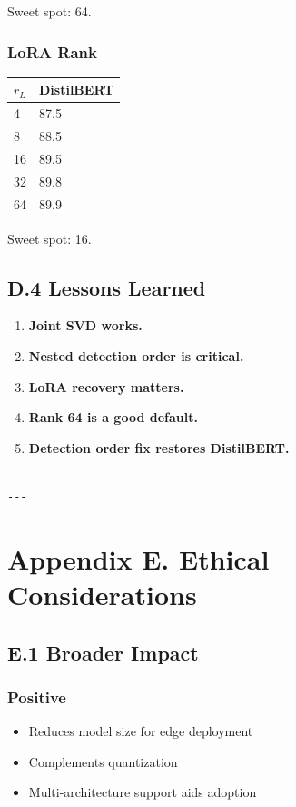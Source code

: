 Sweet spot: 64.

\subsubsection{LoRA Rank}

\begin{table}[H]
\centering
\small
\begin{tabular}{ll}
\toprule
\textbf{$r_L$} & \textbf{DistilBERT} \\
\midrule
4 & 87.5 \\
8 & 88.5 \\
16 & 89.5 \\
32 & 89.8 \\
64 & 89.9 \\
\bottomrule
\end{tabular}
\end{table}

Sweet spot: 16.

\subsection{D.4 Lessons Learned}

\begin{enumerate}
\item \textbf{Joint SVD works.}
\item \textbf{Nested detection order is critical.}
\item \textbf{LoRA recovery matters.}
\item \textbf{Rank 64 is a good default.}
\item \textbf{Detection order fix restores DistilBERT.}
\end{enumerate}
\begin{lstlisting}

---
\end{lstlisting}

\section{Appendix E. Ethical Considerations}

\subsection{E.1 Broader Impact}

\subsubsection{Positive}
\begin{itemize}
\item Reduces model size for edge deployment
\item Complements quantization
\item Multi-architecture support aids adoption

\end{itemize}
